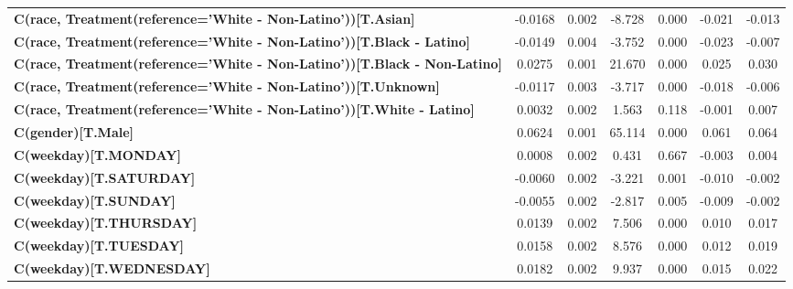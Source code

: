 \begin{center}
\begin{tabular}{lcccccc}
\textbf{C(race, Treatment(reference='White - Non-Latino'))[T.Asian]}              &      -0.0168  &        0.002     &    -8.728  &         0.000        &       -0.021    &       -0.013     \\
\textbf{C(race, Treatment(reference='White - Non-Latino'))[T.Black - Latino]}     &      -0.0149  &        0.004     &    -3.752  &         0.000        &       -0.023    &       -0.007     \\
\textbf{C(race, Treatment(reference='White - Non-Latino'))[T.Black - Non-Latino]} &       0.0275  &        0.001     &    21.670  &         0.000        &        0.025    &        0.030     \\
\textbf{C(race, Treatment(reference='White - Non-Latino'))[T.Unknown]}            &      -0.0117  &        0.003     &    -3.717  &         0.000        &       -0.018    &       -0.006     \\
\textbf{C(race, Treatment(reference='White - Non-Latino'))[T.White - Latino]}     &       0.0032  &        0.002     &     1.563  &         0.118        &       -0.001    &        0.007     \\
\textbf{C(gender)[T.Male]}                                                        &       0.0624  &        0.001     &    65.114  &         0.000        &        0.061    &        0.064     \\
\textbf{C(weekday)[T.MONDAY]}                                                     &       0.0008  &        0.002     &     0.431  &         0.667        &       -0.003    &        0.004     \\
\textbf{C(weekday)[T.SATURDAY]}                                                   &      -0.0060  &        0.002     &    -3.221  &         0.001        &       -0.010    &       -0.002     \\
\textbf{C(weekday)[T.SUNDAY]}                                                     &      -0.0055  &        0.002     &    -2.817  &         0.005        &       -0.009    &       -0.002     \\
\textbf{C(weekday)[T.THURSDAY]}                                                   &       0.0139  &        0.002     &     7.506  &         0.000        &        0.010    &        0.017     \\
\textbf{C(weekday)[T.TUESDAY]}                                                    &       0.0158  &        0.002     &     8.576  &         0.000        &        0.012    &        0.019     \\
\textbf{C(weekday)[T.WEDNESDAY]}                                                  &       0.0182  &        0.002     &     9.937  &         0.000        &        0.015    &        0.022     \\

\end{tabular}
\end{center}
